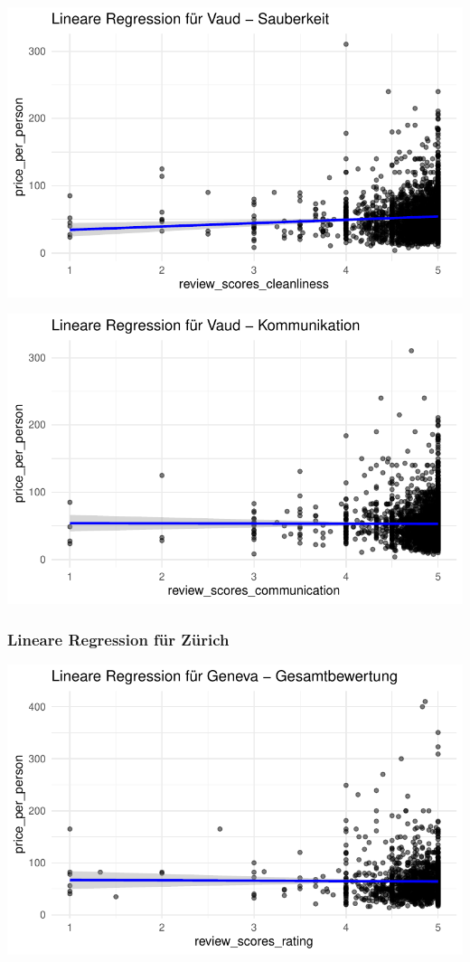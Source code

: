 \documentclass[
  journal,
]{IEEEtran}%
\begin{document}
\includegraphics{main_files/figure-pdf/unnamed-chunk-15-2.pdf}

\includegraphics{main_files/figure-pdf/unnamed-chunk-15-3.pdf}

\subsubsection{Lineare Regression für
Zürich}\label{lineare-regression-fuxfcr-zuxfcrich}

\includegraphics{main_files/figure-pdf/unnamed-chunk-16-1.pdf}
\end{document}
